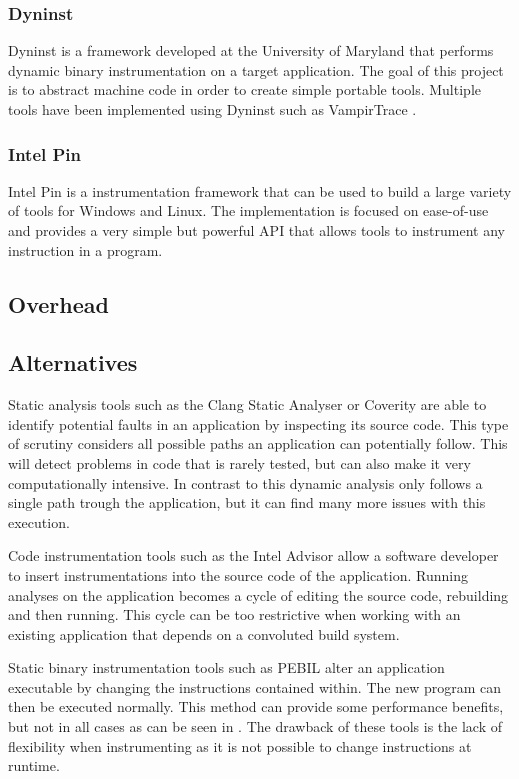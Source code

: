 \subsubsection{Dyninst}

Dyninst \cite{dyninst} is a framework developed at the University of Maryland that performs dynamic binary instrumentation on a target application. The goal of this project is to abstract machine code in order to create simple portable tools. Multiple tools have been implemented using Dyninst such as VampirTrace \cite{vampirtrace}.

\subsubsection{Intel Pin}

Intel Pin \cite{pin} is a instrumentation framework that can be used to build a large variety of tools for Windows and Linux. The implementation is focused on ease-of-use and provides a very simple but powerful API that allows tools to instrument any instruction in a program.

\subsection{Overhead}

\subsection{Alternatives}

Static analysis tools such as the Clang Static Analyser \cite{clang} or Coverity \cite{coverity} are able to identify potential faults in an application by inspecting its source code. This type of scrutiny considers all possible paths an application can potentially follow. This will detect problems in code that is rarely tested, but can also make it very computationally intensive. In contrast to this dynamic analysis only follows a single path trough the application, but it can find many more issues with this execution.

Code instrumentation tools such as the Intel Advisor \cite{inteladvisor} allow a software developer to insert instrumentations into the source code of the application. Running analyses on the application becomes a cycle of editing the source code, rebuilding and then running. This cycle can be too restrictive when working with an existing application that depends on a convoluted build system.

Static binary instrumentation tools such as PEBIL \cite{pebil} alter an application executable by changing the instructions contained within. The new program can then be executed normally. This method can provide some performance benefits, but not in all cases as can be seen in \cite{pebilperf}. The drawback of these tools is the lack of flexibility when instrumenting as it is not possible to change instructions at runtime.



